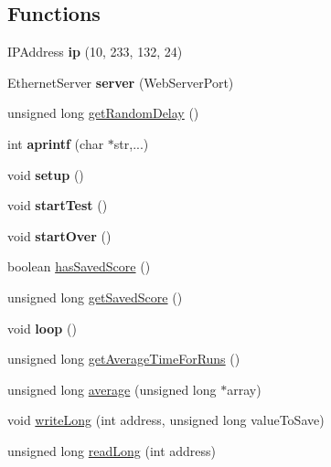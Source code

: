 \subsection*{Functions}
\begin{DoxyCompactItemize}
\item 
\mbox{\label{test_8ino_a47343b8b7406f28cf29d8b0285fdd388}} 
I\+P\+Address {\bfseries ip} (10, 233, 132, 24)
\item 
\mbox{\label{test_8ino_acc33ddf5eb1a701fe7fc54e6c558f76b}} 
Ethernet\+Server {\bfseries server} (Web\+Server\+Port)
\item 
unsigned long \mbox{\hyperlink{test_8ino_acfe46c2625596d6b059364eae0d9de41}{get\+Random\+Delay}} ()
\item 
\mbox{\label{test_8ino_acf86b2821b6508dcc5b16428d63d1dfd}} 
int {\bfseries aprintf} (char $\ast$str,...)
\item 
\mbox{\label{test_8ino_a4fc01d736fe50cf5b977f755b675f11d}} 
void {\bfseries setup} ()
\item 
\mbox{\label{test_8ino_a347505306ad1e528ecf6b6f19866b5a5}} 
void {\bfseries start\+Test} ()
\item 
\mbox{\label{test_8ino_a56253a1424a135b174dcc12716a79d75}} 
void {\bfseries start\+Over} ()
\item 
boolean \mbox{\hyperlink{test_8ino_a832bc26a7873ae480d28907b29880813}{has\+Saved\+Score}} ()
\item 
unsigned long \mbox{\hyperlink{test_8ino_ae10d67159ad951c6d293550eba144547}{get\+Saved\+Score}} ()
\item 
\mbox{\label{test_8ino_afe461d27b9c48d5921c00d521181f12f}} 
void {\bfseries loop} ()
\item 
unsigned long \mbox{\hyperlink{test_8ino_a3991b3fec82a370bed6f323e5496ba34}{get\+Average\+Time\+For\+Runs}} ()
\item 
unsigned long \mbox{\hyperlink{test_8ino_a3f58cad8e546d58d8d275655e22964c9}{average}} (unsigned long $\ast$array)
\item 
void \mbox{\hyperlink{test_8ino_a5b02fbb87448a058cc6f3d4a1158afc2}{write\+Long}} (int address, unsigned long value\+To\+Save)
\item 
unsigned long \mbox{\hyperlink{test_8ino_a9481ce48d8cc7194d54460345fdc4a1e}{read\+Long}} (int address)
\end{DoxyCompactItemize}
